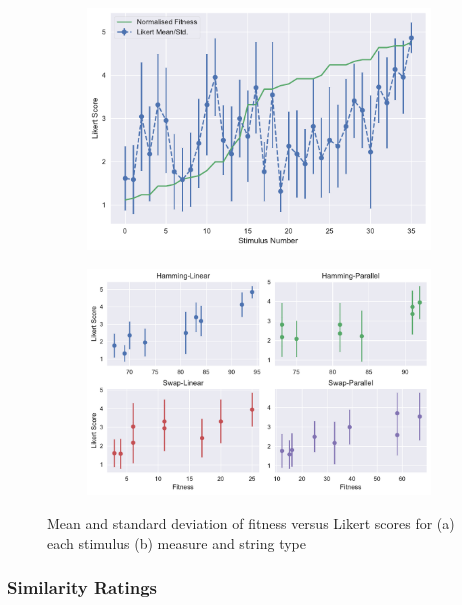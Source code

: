 {\begin{figure}
\centering
\begin{subfigure}[b]{0.75\textwidth}
   \includegraphics[width=1\linewidth]{ch03_symbolic/figures/total_likert.pdf}
   \caption{}
   \label{fig:like1} 
\end{subfigure}

\begin{subfigure}[b]{0.75\textwidth}
   \includegraphics[width=1\linewidth]{ch03_symbolic/figures/separate_likerts.pdf}
   \caption{}
   \label{fig:like2}
\end{subfigure}

\caption[Two numerical solutions]{Mean and standard deviation of fitness versus Likert scores for (a) each stimulus (b) measure and string type }
\end{figure}
\subsubsection{Similarity Ratings}

}

